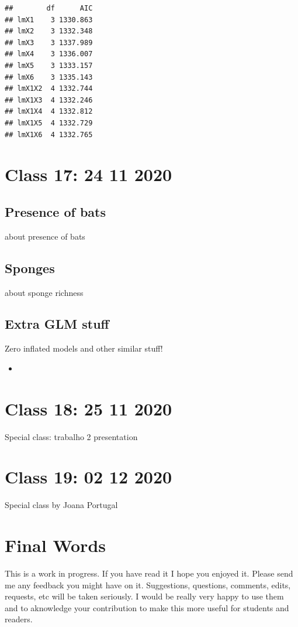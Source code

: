\documentclass[
]{book}
\providecommand{\tightlist}{%
  \setlength{\itemsep}{0pt}\setlength{\parskip}{0pt}}
\begin{document}
\begin{verbatim}
##        df      AIC
## lmX1    3 1330.863
## lmX2    3 1332.348
## lmX3    3 1337.989
## lmX4    3 1336.007
## lmX5    3 1333.157
## lmX6    3 1335.143
## lmX1X2  4 1332.744
## lmX1X3  4 1332.246
## lmX1X4  4 1332.812
## lmX1X5  4 1332.729
## lmX1X6  4 1332.765
\end{verbatim}

\hypertarget{aula17}{%
\chapter{Class 17: 24 11 2020}\label{aula17}}

\hypertarget{presence-of-bats}{%
\section{Presence of bats}\label{presence-of-bats}}

about presence of bats

\hypertarget{sponges}{%
\section{Sponges}\label{sponges}}

about sponge richness

\hypertarget{extra-glm-stuff}{%
\section{Extra GLM stuff}\label{extra-glm-stuff}}

Zero inflated models and other similar stuff!

\begin{itemize}
\tightlist
\item
  \citet{Martin2005}
\end{itemize}

\hypertarget{aula18}{%
\chapter{Class 18: 25 11 2020}\label{aula18}}

Special class: trabalho 2 presentation

\hypertarget{aula19}{%
\chapter{Class 19: 02 12 2020}\label{aula19}}

Special class by Joana Portugal

\hypertarget{final-words}{%
\chapter{Final Words}\label{final-words}}

This is a work in progress. If you have read it I hope you enjoyed it. Please send me any feedback you might have on it. Suggestions, questions, comments, edits, requests, etc will be taken seriously. I would be really very happy to use them and to aknowledge your contribution to make this more useful for students and readers.

  
\end{document}
